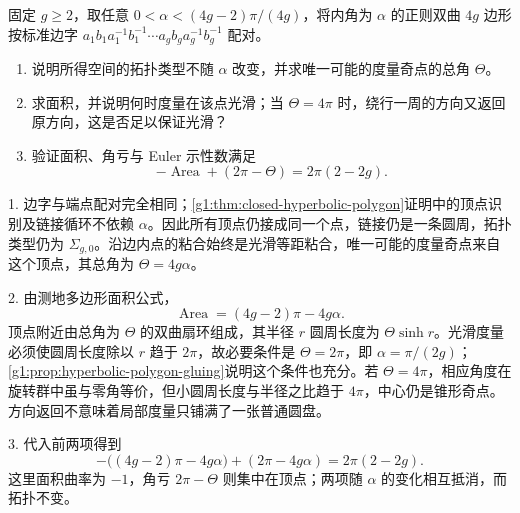 \begin{exercise}\label{g1:ex:hyperbolic-polygon-cone-angle}
	固定 \(g\ge2\)，取任意 \(0<\alpha<(4g-2)\pi/(4g)\)，将内角为 \(\alpha\) 的正则双曲 \(4g\) 边形按标准边字 \(a_1b_1a_1^{-1}b_1^{-1}\cdots a_gb_ga_g^{-1}b_g^{-1}\) 配对。
	\begin{enumerate}
		\item 说明所得空间的拓扑类型不随 \(\alpha\) 改变，并求唯一可能的度量奇点的总角 \(\Theta\)。
		\item 求面积，并说明何时度量在该点光滑；当 \(\Theta=4\pi\) 时，绕行一周的方向又返回原方向，这是否足以保证光滑？
		\item 验证面积、角亏与 Euler 示性数满足
		\[
			-\operatorname{Area}+(2\pi-\Theta)=2\pi(2-2g).
		\]
	\end{enumerate}
\end{exercise}
\begin{solution}
	1. 边字与端点配对完全相同；\cref{g1:thm:closed-hyperbolic-polygon}证明中的顶点识别及链接循环不依赖 \(\alpha\)。因此所有顶点仍接成同一个点，链接仍是一条圆周，拓扑类型仍为 \(\Sigma_{g,0}\)。沿边内点的粘合始终是光滑等距粘合，唯一可能的度量奇点来自这个顶点，其总角为 \(\Theta=4g\alpha\)。

	2. 由测地多边形面积公式，
	\[
		\operatorname{Area}=(4g-2)\pi-4g\alpha.
	\]
	顶点附近由总角为 \(\Theta\) 的双曲扇环组成，其半径 \(r\) 圆周长度为 \(\Theta\sinh r\)。光滑度量必须使圆周长度除以 \(r\) 趋于 \(2\pi\)，故必要条件是 \(\Theta=2\pi\)，即 \(\alpha=\pi/(2g)\)；\cref{g1:prop:hyperbolic-polygon-gluing}说明这个条件也充分。若 \(\Theta=4\pi\)，相应角度在旋转群中虽与零角等价，但小圆周长度与半径之比趋于 \(4\pi\)，中心仍是锥形奇点。方向返回不意味着局部度量只铺满了一张普通圆盘。

	3. 代入前两项得到
	\[
		-\bigl((4g-2)\pi-4g\alpha\bigr)+(2\pi-4g\alpha)
		=2\pi(2-2g).
	\]
	这里面积曲率为 \(-1\)，角亏 \(2\pi-\Theta\) 则集中在顶点；两项随 \(\alpha\) 的变化相互抵消，而拓扑不变。
\end{solution}

